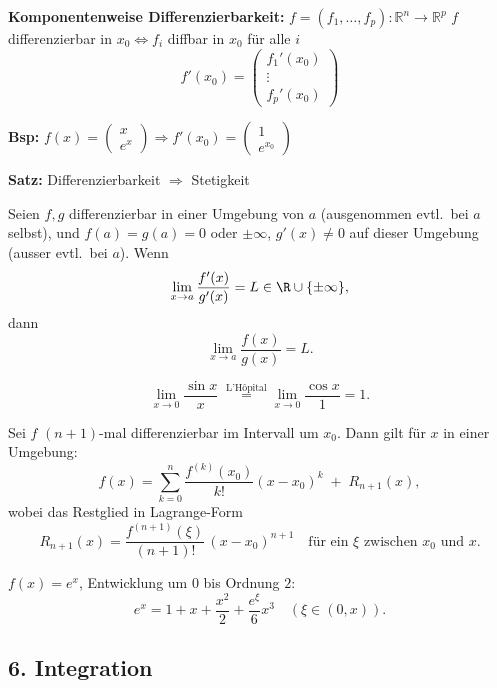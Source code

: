\textbf{Komponentenweise Differenzierbarkeit:}  
\(f = (f_1, \dots, f_p): \mathbb{R}^n \to \mathbb{R}^p\)  
\(f\) differenzierbar in \(x_0 \Leftrightarrow f_i\) diffbar in \(x_0\) für alle \(i\)  
\[
f'(x_0) = \begin{pmatrix} f_1'(x_0) \\ \vdots \\ f_p'(x_0) \end{pmatrix}
\]

\textbf{Bsp:} \(f(x) = \begin{pmatrix} x \\ e^x \end{pmatrix} \Rightarrow f'(x_0) = \begin{pmatrix} 1 \\ e^{x_0} \end{pmatrix}\)

\textbf{Satz:}  
Differenzierbarkeit \(\Rightarrow\) Stetigkeit


\begin{theorem}
  Seien $f,g$ differenzierbar in einer Umgebung von $a$ (ausgenommen evtl.\ bei $a$ selbst), und $f(a)=g(a)=0$ oder $\pm\infty$, $g'(x)\ne0$ auf dieser Umgebung (ausser evtl.\ bei $a$). Wenn
  \[
    \lim_{x\to a} \frac{f'(x)}{g'(x)} = L \in \R \cup \{\pm\infty\},
  \]
  dann
  \[
    \lim_{x\to a} \frac{f(x)}{g(x)} = L.
  \]
\end{theorem}
\begin{example}
  \[
    \lim_{x\to0} \frac{\sin x}{x} 
    \;\stackrel{\text{L'Hôpital}}= 
    \lim_{x\to0} \frac{\cos x}{1} = 1.
  \]
\end{example}

\begin{theorem}[Taylor, 1-D]
  Sei $f$ $(n+1)$-mal differenzierbar im Intervall um $x_0$. Dann gilt für $x$ in einer Umgebung:
  \[
    f(x) = \sum_{k=0}^n \frac{f^{(k)}(x_0)}{k!}(x - x_0)^k 
    \;+\; R_{n+1}(x),
  \]
  wobei das Restglied in Lagrange-Form
  \[
    R_{n+1}(x) = \frac{f^{(n+1)}(\xi)}{(n+1)!}\,(x - x_0)^{n+1}
    \quad\text{für ein }\xi\text{ zwischen }x_0\text{ und }x.
  \]
\end{theorem}
\begin{example}
  $f(x) = e^x$, Entwicklung um $0$ bis Ordnung $2$:
  \[
    e^x = 1 + x + \frac{x^2}{2} + \frac{e^\xi}{6} x^3 \quad(\xi\in(0,x)).
  \]
\end{example}

\subsection{6. Integration}